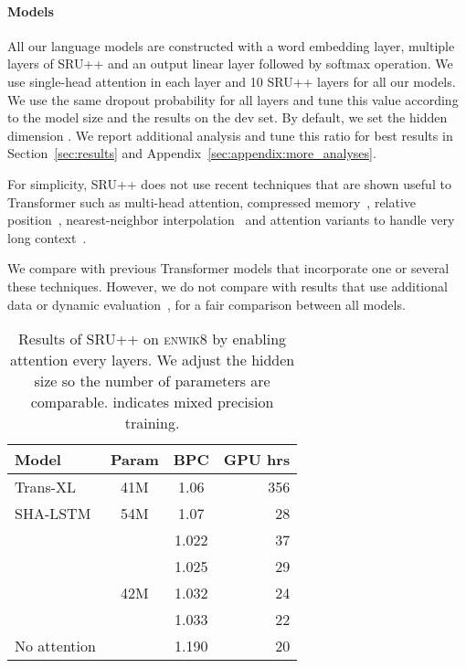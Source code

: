 \paragraph{Models}
All our language models are constructed with a word embedding layer, multiple layers of SRU++ and an output linear layer followed by softmax operation. 
We use single-head attention in each layer and 10 SRU++ layers for all our models.
We use the same dropout probability for all layers and tune this value according to the model size and the results on the dev set.
By default, we set the hidden dimension .
We report additional analysis and tune this ratio for best results in Section~\ref{sec:results} and Appendix~\ref{sec:appendix:more_analyses}.


For simplicity, SRU++ does not use recent techniques that are shown useful to Transformer such as multi-head attention, compressed memory~\cite{Rae2020Compressive}, relative position~\cite{shaw-etal-2018-self,press2020shortformer}, nearest-neighbor interpolation~\cite{Khandelwal2020Generalization} and attention variants to handle very long context~\cite{sukhbaatar-etal-2019-adaptive,roy2020efficient}.

We compare with previous Transformer models that incorporate one or several these techniques.
However, we do not compare with results that use additional data or dynamic evaluation~\cite{Graves13,pmlr-v80-krause18a},
for a fair comparison between all models.


\begin{table}[!t]
    \centering
    \begin{tabular}{lccr}
    \toprule
    \bf Model & \bf Param & \bf BPC  & \bf GPU hrs\\
    \hline
    Trans-XL & 41M & 1.06 & 356\\
    SHA-LSTM & 54M & 1.07 & 28\\
    \hline
     & \multirow{5}{*}{42M} & 1.022 & 37\\
     & & 1.025 & 29\\
     & & 1.032 & 24\\
     & & 1.033 & 22\\
    No attention & & 1.190 & 20\\
    \bottomrule
    \end{tabular}
    \caption{Results of SRU++ on \textsc{enwik8} by enabling attention every  layers. We adjust the hidden size so the number of parameters are comparable.  indicates mixed precision training.}
    \label{table:analyze_attention}
\end{table}

